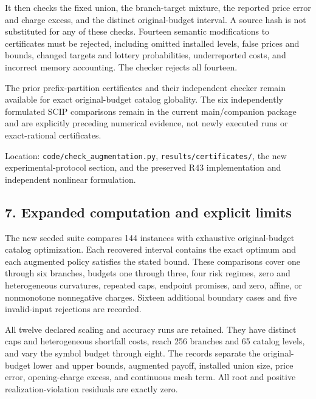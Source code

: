 \documentclass[11pt,letterpaper]{article}
\begin{document}
It then checks the fixed union, the branch-target mixture, the reported price error and charge excess, and the distinct original-budget interval. A source hash is not substituted for any of these checks. Fourteen semantic modifications to certificates must be rejected, including omitted installed levels, false prices and bounds, changed targets and lottery probabilities, underreported costs, and incorrect memory accounting. The checker rejects all fourteen.



The prior prefix-partition certificates and their independent checker remain available for exact original-budget catalog globality. The six independently formulated SCIP comparisons remain in the current main/companion package and are explicitly preceding numerical evidence, not newly executed runs or exact-rational certificates.



Location: \nolinkurl{code/check_augmentation.py}, \nolinkurl{results/certificates/}, the new experimental-protocol section, and the preserved R43 implementation and independent nonlinear formulation.



\subsection*{7. Expanded computation and explicit limits}


The new seeded suite compares 144 instances with exhaustive original-budget catalog optimization. Each recovered interval contains the exact optimum and each augmented policy satisfies the stated bound. These comparisons cover one through six branches, budgets one through three, four risk regimes, zero and heterogeneous curvatures, repeated caps, endpoint promises, and zero, affine, or nonmonotone nonnegative charges. Sixteen additional boundary cases and five invalid-input rejections are recorded.



All twelve declared scaling and accuracy runs are retained. They have distinct caps and heterogeneous shortfall costs, reach 256 branches and 65 catalog levels, and vary the symbol budget through eight. The records separate the original-budget lower and upper bounds, augmented payoff, installed union size, price error, opening-charge excess, and continuous mesh term. All root and positive realization-violation residuals are exactly zero.
\end{document}
